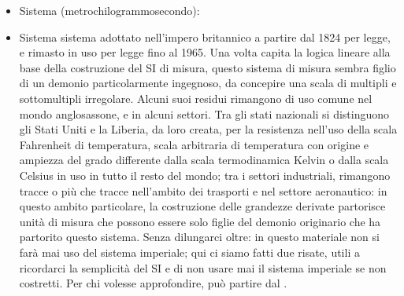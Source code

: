 \documentclass[letterpaper,10pt,italian]{jupyterBook}
\begin{document}
\begin{itemize}
\item {} 
\sphinxAtStartPar
Sistema  (metro\sphinxhyphen{}chilogrammo\sphinxhyphen{}secondo):

\item {} 
\sphinxAtStartPar
Sistema  sistema adottato nell’impero britannico a partire dal 1824 per legge, e rimasto in uso per legge fino al 1965. Una volta capita la logica lineare alla base della costruzione del SI di misura, questo sistema di misura sembra figlio di un demonio particolarmente ingegnoso, da concepire una scala di multipli e sottomultipli irregolare. Alcuni suoi residui rimangono di uso comune nel mondo anglosassone, e in alcuni settori. Tra gli stati nazionali si distinguono gli Stati Uniti e la Liberia, da loro creata, per la resistenza nell’uso della scala Fahrenheit di temperatura, scala arbitraria di temperatura con origine e ampiezza del grado differente dalla scala termodinamica Kelvin o dalla scala Celsius in uso in tutto il resto del mondo; tra i settori industriali, rimangono tracce o più che tracce nell’ambito dei trasporti e nel settore aeronautico: in questo ambito particolare, la costruzione delle grandezze derivate partorisce unità di misura che possono essere solo figlie del demonio originario che ha partorito questo sistema. Senza dilungarci oltre: in questo materiale non si farà mai uso del sistema imperiale; qui ci siamo fatti due risate, utili a ricordarci la semplicità del SI e di non usare mai il sistema imperiale se non costretti. Per chi volesse approfondire, può partire dal .

\end{itemize}
\end{document}
